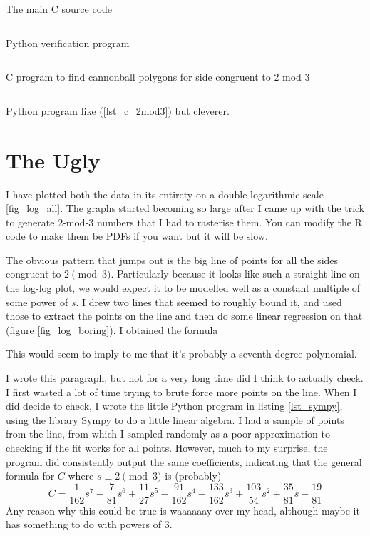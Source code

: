 \begin{longlisting}
\inputminted{c}{../src/c/cannonball.c}
\caption{The main C source code}
\label{lst_c}
\end{longlisting}

\begin{longlisting}
\inputminted{python}{../src/factcheck.py}
\caption{Python verification program}
\label{lst_py_verif}
\end{longlisting}

\begin{longlisting}
\inputminted{c}{../src/c/2mod3/2mod3.c}
\caption{C program to find cannonball polygons for side congruent to 2 mod 3}
\label{lst_c_2mod3}
\end{longlisting}

\begin{longlisting}
\inputminted{c}{../src/c/2mod3/2mod3.py}
\caption{Python program like (\ref{lst_c_2mod3}) but cleverer.}
\label{lst_py_2mod3}
\end{longlisting}

\section{The Ugly}

I have plotted both the data in its entirety on a double logarithmic scale
\ref{fig_log_all}. The graphs started becoming so large after I came up with the
trick to generate 2-mod-3 numbers that I had to rasterise them. You can modify
the R code to make them be PDFs if you want but it will be slow.

The obvious pattern that jumps out is the big line of points for all the sides
congruent to \(2 \pmod 3\). Particularly because it looks like such a straight
line on the log-log plot, we would expect it to be modelled well as a constant
multiple of some power of \(s\). I drew two lines that seemed to roughly bound
it, and used those to extract the points on the line and then do some linear
regression on that (figure \ref{fig_log_boring}). I obtained the formula

This would seem to imply to me that it's probably a seventh-degree polynomial.

I wrote this paragraph, but not for a very long time did I think to actually
check. I first wasted a lot of time trying to brute force more points on the
line. When I did decide to check, I wrote the little Python program in listing
\ref{lst_sympy}, using the library Sympy to do a little linear algebra. I had a
sample of points from the line, from which I sampled randomly as a poor
approximation to checking if the fit works for all points. However, much to my
surprise, the program did consistently output the same coefficients, indicating
that the general formula for \(C\) where \(s \equiv 2 \pmod 3\) is (probably)
\begin{equation*}
C = \frac{1}{162}s^7 - \frac{7}{81}s^6 + \frac{11}{27}s^5 - \frac{91}{162}s^4
    - \frac{133}{162}s^3 + \frac{103}{54}s^2 + \frac{35}{81}s - \frac{19}{81}
\end{equation*}
Any reason why this could be true is waaaaaay over my head, although maybe it
has something to do with powers of 3.

